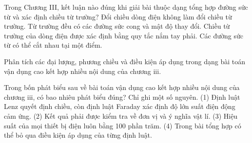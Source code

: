 \begin{ex}
Trong Chương III, kết luận nào đúng khi giải bài thuộc dạng tổng hợp đường sức từ và xác định chiều từ trường?
\choice
{Đổi chiều dòng điện không làm đổi chiều từ trường.}
{Từ trường đều có các đường sức cong và mật độ thay đổi.}
{\True Chiều từ trường của dòng điện được xác định bằng quy tắc nắm tay phải.}
{Các đường sức từ có thể cắt nhau tại một điểm.}
\end{ex}

\begin{bt}
Phân tích các đại lượng, phương chiều và điều kiện áp dụng trong dạng bài toán vận dụng cao kết hợp nhiều nội dung của chương iii.
\end{bt}

\begin{ex}
Trong bốn phát biểu sau về bài toán vận dụng cao kết hợp nhiều nội dung của chương iii, có bao nhiêu phát biểu đúng? Chỉ ghi một số nguyên. (1) Định luật Lenz quyết định chiều, còn định luật Faraday xác định độ lớn suất điện động cảm ứng. (2) Kết quả phải được kiểm tra về đơn vị và ý nghĩa vật lí. (3) Hiệu suất của mọi thiết bị điện luôn bằng 100 phần trăm. (4) Trong bài tổng hợp có thể bỏ qua điều kiện áp dụng của từng định luật.
\end{ex}

